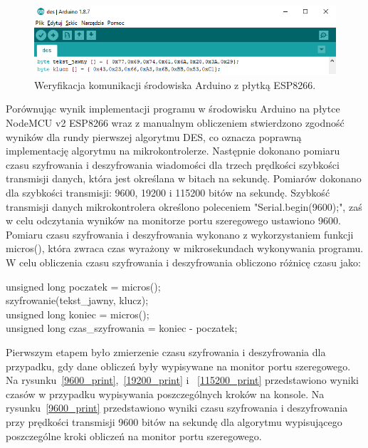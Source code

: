 \documentclass[12p]{article}
\begin{document}
\begin{figure}[H]
\centering
\includegraphics[width=12cm]{klucz_tekst.png}
\caption{Weryfikacja komunikacji środowiska Arduino z płytką ESP8266.}\label{klucz_tekst}
\end{figure}



Porównując wynik implementacji programu w środowisku Arduino na płytce NodeMCU v2 ESP8266 wraz z manualnym obliczeniem stwierdzono zgodność wyników dla rundy pierwszej algorytmu DES, co oznacza poprawną implementację algorytmu na mikrokontrolerze. Następnie dokonano pomiaru czasu szyfrowania i deszyfrowania wiadomości dla trzech prędkości szybkości transmisji danych, która jest określana w bitach na sekundę. Pomiarów dokonano dla szybkości transmisji: 9600, 19200 i 115200 bitów na sekundę. Szybkość transmisji danych mikrokontrolera określono poleceniem "Serial.begin(9600);", zaś w celu odczytania wyników na monitorze portu szeregowego ustawiono 9600. Pomiaru czasu szyfrowania i deszyfrowania wykonano z wykorzystaniem funkcji micros(), która zwraca czas wyrażony w mikrosekundach wykonywania programu. W celu obliczenia czasu szyfrowania i deszyfrowania obliczono różnicę czasu jako:\\
\begin{center}
unsigned long poczatek = micros();\\
szyfrowanie(tekst\_jawny, klucz);\\
unsigned long koniec = micros();\\
unsigned long czas\_szyfrowania = koniec - poczatek;\\
\end{center}

Pierwszym etapem było zmierzenie czasu szyfrowania i deszyfrowania dla przypadku, gdy dane obliczeń były wypisywane na monitor portu szeregowego. Na rysunku~\ref{9600_print},~\ref{19200_print} i ~\ref{115200_print} przedstawiono wyniki czasów w przypadku wypisywania poszczególnych kroków na konsole. Na rysunku~\ref{9600_print} przedstawiono wyniki czasu szyfrowania i deszyfrowania przy prędkości transmisji 9600 bitów na sekundę dla algorytmu wypisującego poszczególne kroki obliczeń na monitor portu szeregowego.
\end{document}
